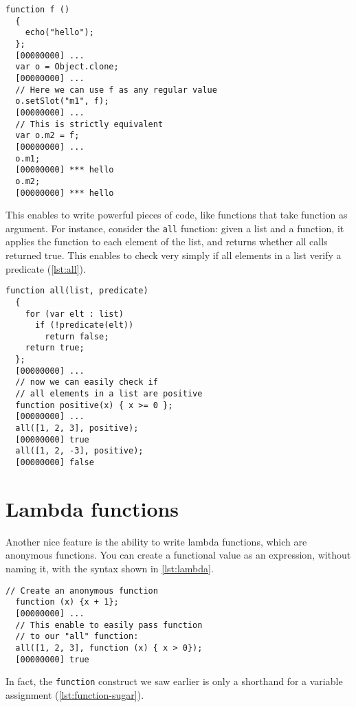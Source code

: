 \documentclass[openright,twoside,12pt]{report}
\newcommand{\lst}[1]{\autoref{lst:#1}}
\begin{document}
\begin{lstlisting}[caption=First class functions,
  label=lst:first-class-functions]
  function f ()
  {
    echo("hello");
  };
  [00000000] ...
  var o = Object.clone;
  [00000000] ...
  // Here we can use f as any regular value
  o.setSlot("m1", f);
  [00000000] ...
  // This is strictly equivalent
  var o.m2 = f;
  [00000000] ...
  o.m1;
  [00000000] *** hello
  o.m2;
  [00000000] *** hello
\end{lstlisting}

This enables to write powerful pieces of code, like functions that
take function as argument. For instance, consider the \texttt{all}
function: given a list and a function, it applies the function to each
element of the list, and returns whether all calls returned true. This
enables to check very simply if all elements in a list verify a
predicate (\lst{all}).

\begin{lstlisting}[caption=Functional programming: the \texttt{all}
  function, label=lst:all]
  function all(list, predicate)
  {
    for (var elt : list)
      if (!predicate(elt))
        return false;
    return true;
  };
  [00000000] ...
  // now we can easily check if
  // all elements in a list are positive
  function positive(x) { x >= 0 };
  [00000000] ...
  all([1, 2, 3], positive);
  [00000000] true
  all([1, 2, -3], positive);
  [00000000] false
\end{lstlisting}

\section{Lambda functions}

Another nice feature is the ability to write lambda functions, which
are anonymous functions. You can create a functional value as an
expression, without naming it, with the syntax shown in \lst{lambda}.

\begin{lstlisting}[caption=Lambda function, label=lst:lambda]
  // Create an anonymous function
  function (x) {x + 1};
  [00000000] ...
  // This enable to easily pass function
  // to our "all" function:
  all([1, 2, 3], function (x) { x > 0});
  [00000000] true
\end{lstlisting}

In fact, the \texttt{function} construct we saw earlier is only a
shorthand for a variable assignment (\lst{function-sugar}).
\end{document}
